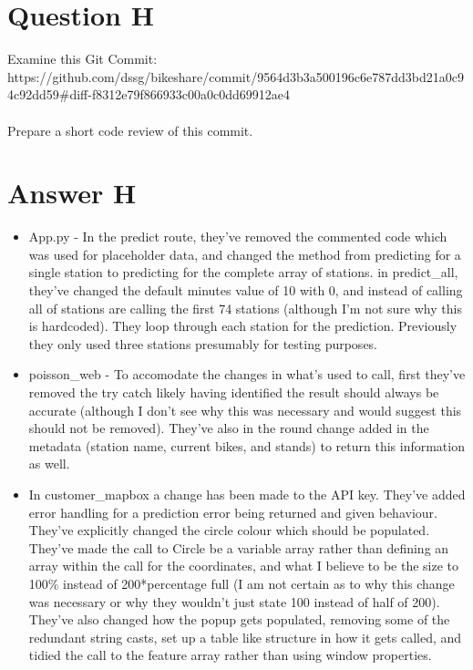 \documentclass{scrreprt}
\begin{document}
\pagebreak
\section{Question H}\label{QH}
Examine this Git Commit: https://github.com/dssg/bikeshare/commit/9564d3b3a500196c6e787dd3bd21a0c94c92dd59\#diff-f8312e79f866933c00a0c0dd69912ae4 \\
\\
Prepare a short code review of this commit.
\section{Answer H}\label{AH}
\begin{itemize}
	\item App.py - In the predict route, they've removed the commented code which was used for placeholder data, and changed the method from predicting for a single station to predicting for the complete array of stations. in predict\_all, they've changed the default minutes value of 10 with 0, and instead of calling all of stations are calling the first 74 stations (although I'm not sure why this is hardcoded). They loop through each station  for the prediction. Previously they only used three stations presumably for testing purposes.
	\item poisson\_web - To accomodate the changes in what's used to call, first they've removed the try catch likely having identified the result should always be accurate (although I don't see why this was necessary and would suggest this should not be removed). They've also in the round change added in the metadata (station name, current bikes, and stands) to return this information as well.
	\item In customer\_mapbox a change has been made to the API key. They've added error handling for a prediction error being returned and given behaviour. They've explicitly changed the circle colour which should be populated. They've made the call to Circle be a variable array rather than defining an array within the call for the coordinates, and what I believe to be the size to 100\% instead of 200*percentage full (I am not certain as to why this change was necessary or why they wouldn't just state 100 instead of half of 200). They've also changed how the popup gets populated, removing some of the redundant string casts, set up a table like structure in how it gets called, and tidied the call to the feature array rather than using window properties.
\end{itemize}
\end{document}
